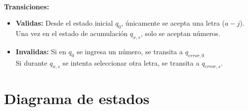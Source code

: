 \documentclass{article}
\begin{document}
\begin{table}[H]
\centering
\renewcommand{\arraystretch}{1.6}
\caption{El estado de aceptación $F$ ($*$) se alcanza cuando $s \ge precio(x)$.}
\end{table}

\textbf{\\[0.25cm]Transiciones:}
\begin{itemize}
    \item \textbf{Validas:} Desde el estado inicial $q_0$, únicamente se acepta una letra ($a-j$).
    \\ Una vez en el estado de acumulación $q_{x, s}$, solo se aceptan números.
    \item \textbf{Invalidas:} Si en $q_0$ se ingresa un número, se transita a $q_{error, 0}$\\ Si durante $q_{x, s}$ se intenta seleccionar otra letra, se transita a $q_{error, s}$.
\end{itemize}

\section{Diagrama de estados}
\end{document}

